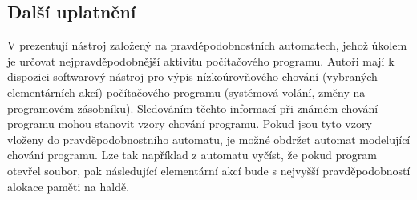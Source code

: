 \documentclass[a4paper,10pt]{article}
\begin{document}



% 


\subsection{Další uplatnění}

V \cite{Maz+-ProTreAutAppBehMod} prezentují nástroj založený na pravděpodobnostních automatech, jehož úkolem je určovat nejpravděpodobnější aktivitu počítačového programu. Autoři mají k dispozici softwarový nástroj pro výpis nízkoúrovňového chování (vybraných elementárních akcí) počítačového programu (systémová volání, změny na programovém zásobníku). Sledováním těchto informací při známém chování programu mohou stanovit vzory chování programu. Pokud jsou tyto vzory vloženy do pravděpodobnostního automatu, je možné obdržet automat modelující chování programu. Lze tak například z automatu vyčíst, že pokud program otevřel soubor, pak následující elementární akcí bude s nejvyšší pravděpodobností alokace paměti na haldě.
\end{document}
